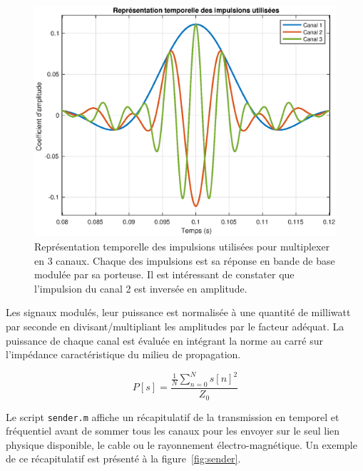 \documentclass[10pt, oneside, a4paper]{article}
\begin{document}
\begin{figure}[htbp]
	\includegraphics[width=\textwidth]{eps/impulse.eps}
	\caption{Représentation temporelle des impulsions utilisées pour multiplexer en 3 canaux.
			 Chaque des impulsions est sa réponse en bande de base modulée par sa porteuse.
			 Il est intéressant de constater que l'impulsion du canal 2 est inversée en
			 amplitude.}
	\label{fig:impulse}
\end{figure}

Les signaux modulés, leur puissance est normalisée à une quantité de milliwatt par seconde en divisant/multipliant les amplitudes par le facteur adéquat.
La puissance de chaque canal est évaluée en intégrant la norme au carré sur l'impédance caractéristique du milieu de propagation.

\begin{equation}
	P[s] = \frac{\frac{1}{N} \sum_{n = 0}^{N} s[n]^2}{Z_0}
\end{equation}

Le script \texttt{sender.m} affiche un récapitulatif de la transmission en temporel et fréquentiel avant de sommer tous les canaux pour les envoyer sur le seul lien physique disponible, le cable ou le rayonnement électro-magnétique.
Un exemple de ce récapitulatif est présenté à la figure~\ref{fig:sender}.
\end{document}
